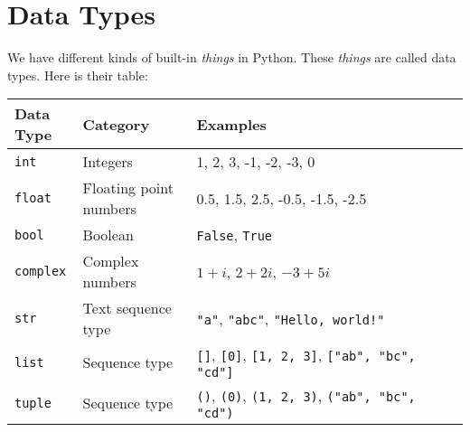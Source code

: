 
\section{Data Types}

We have different kinds of built-in \textit{things} in Python. These \textit{things} are called data
types.
\newline
Here is their table:

\begin{table}[H]
    \begin{tabular}{p{0.15\linewidth}p{0.25\linewidth}p{0.60\linewidth}}
        \toprule
        \textbf{Data Type} & \textbf{Category} & \textbf{Examples}\\
        \midrule

        \texttt{int} & Integers & 1, 2, 3, -1, -2, -3, 0\\
        \midrule

        \texttt{float} & Floating point numbers & 0.5, 1.5, 2.5, -0.5, -1.5, -2.5\\
        \midrule

        \texttt{bool} & Boolean & \texttt{False}, \texttt{True}\\
        \midrule

        \texttt{complex} & Complex numbers & \(1 + i\), \(2 + 2i\), \(-3 + 5i\)\\
        \midrule

        \texttt{str} & Text sequence type & \texttt{"a"},
                                                        \texttt{"abc"},
                                                        \texttt{"Hello, world!"}\\
        \midrule

        \texttt{list} & Sequence type & \texttt{[]},
                                                    \texttt{[0]},
                                                    \texttt{[1, 2, 3]},
                                                    \texttt{["ab", "bc", "cd"]}\\
        \midrule

        \texttt{tuple} & Sequence type & \texttt{()},
                                                     \texttt{(0)},
                                                     \texttt{(1, 2, 3)},
                                                     \texttt{("ab", "bc", "cd")}\\
        \midrule


\end{tabular}
\end{table}
